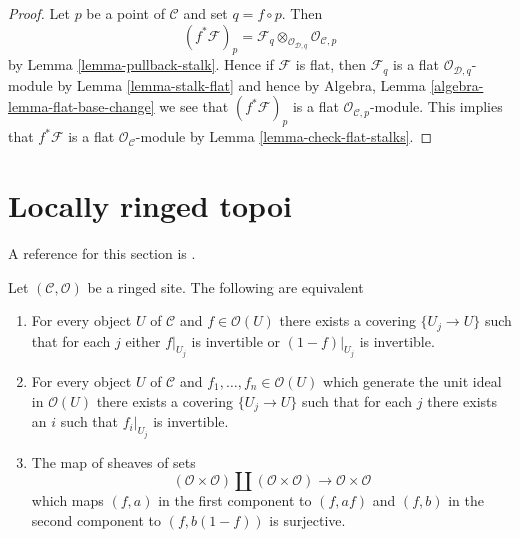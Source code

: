\begin{proof}
Let $p$ be a point of $\mathcal{C}$ and set $q = f \circ p$. Then
$$
(f^*\mathcal{F})_p =
\mathcal{F}_q \otimes_{\mathcal{O}_{\mathcal{D}, q}}
\mathcal{O}_{\mathcal{C}, p}
$$
by
Lemma \ref{lemma-pullback-stalk}.
Hence if $\mathcal{F}$ is flat, then $\mathcal{F}_q$ is a flat
$\mathcal{O}_{\mathcal{D}, q}$-module by
Lemma \ref{lemma-stalk-flat}
and hence by
Algebra, Lemma \ref{algebra-lemma-flat-base-change}
we see that $(f^*\mathcal{F})_p$ is a flat
$\mathcal{O}_{\mathcal{C}, p}$-module.
This implies that $f^*\mathcal{F}$ is a flat
$\mathcal{O}_{\mathcal{C}}$-module by
Lemma \ref{lemma-check-flat-stalks}.
\end{proof}






\section{Locally ringed topoi}
\label{section-locally-ringed}


\noindent
A reference for this section is
\cite[Expos\'e IV, Exercice 13.9]{SGA4}.

\begin{lemma}
\label{lemma-locally-ringed}
Let $(\mathcal{C}, \mathcal{O})$ be a ringed site. The following
are equivalent
\begin{enumerate}
\item For every object $U$ of $\mathcal{C}$ and $f \in \mathcal{O}(U)$
there exists a covering $\{U_j \to U\}$ such that for each $j$
either $f|_{U_j}$ is invertible or $(1 - f)|_{U_j}$ is invertible.
\item For every object $U$ of $\mathcal{C}$ and
$f_1, \ldots, f_n \in \mathcal{O}(U)$ which generate the unit ideal
in $\mathcal{O}(U)$  there exists a covering $\{U_j \to U\}$
such that for each $j$ there exists an $i$ such that $f_i|_{U_j}$
is invertible.
\item The map of sheaves of sets
$$
(\mathcal{O} \times \mathcal{O})
\amalg
(\mathcal{O} \times \mathcal{O})
\longrightarrow
\mathcal{O} \times \mathcal{O}
$$
which maps $(f, a)$ in the first component to $(f, af)$ and
$(f, b)$ in the second component to $(f, b(1 - f))$ is surjective.
\end{enumerate}
\end{lemma}

